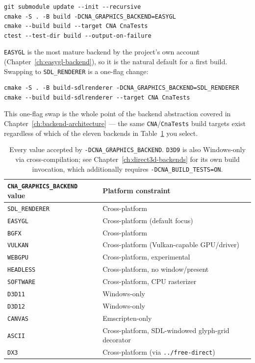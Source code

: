 \begin{lstlisting}[style=cnashell]
git submodule update --init --recursive
cmake -S . -B build -DCNA_GRAPHICS_BACKEND=EASYGL
cmake --build build --target CNA CnaTests
ctest --test-dir build --output-on-failure
\end{lstlisting}

\texttt{EASYGL} is the most mature backend by the project's own account (Chapter~\ref{ch:easygl-backend}),
so it is the natural default for a first build. Swapping to \texttt{SDL\_RENDERER} is a
one-flag change:

\begin{lstlisting}[style=cnashell]
cmake -S . -B build-sdlrenderer -DCNA_GRAPHICS_BACKEND=SDL_RENDERER
cmake --build build-sdlrenderer --target CNA CnaTests
\end{lstlisting}

This one-flag swap is the whole point of the backend abstraction covered in
Chapter~\ref{ch:backend-architecture} --- the same \texttt{CNA}/\texttt{CnaTests} build
targets exist regardless of which of the eleven backends in
Table~\ref{tab:backend-option-list} you select.

\begin{table}[h]
\centering
\begin{tabular}{ll}
\toprule
\textbf{\texttt{CNA\_GRAPHICS\_BACKEND} value} & \textbf{Platform constraint} \\
\midrule
\texttt{SDL\_RENDERER} & Cross-platform \\
\texttt{EASYGL}        & Cross-platform (default focus) \\
\texttt{BGFX}          & Cross-platform \\
\texttt{VULKAN}        & Cross-platform (Vulkan-capable GPU/driver) \\
\texttt{WEBGPU}        & Cross-platform, experimental \\
\texttt{HEADLESS}      & Cross-platform, no window/present \\
\texttt{SOFTWARE}      & Cross-platform, CPU rasterizer \\
\texttt{D3D11}         & Windows-only \\
\texttt{D3D12}         & Windows-only \\
\texttt{CANVAS}        & Emscripten-only \\
\texttt{ASCII}         & Cross-platform, SDL-windowed glyph-grid decorator \\
\texttt{DX3}           & Cross-platform (via \texttt{../free-direct}) \\
\bottomrule
\end{tabular}
\caption{Every value accepted by \texttt{-DCNA\_GRAPHICS\_BACKEND}. \texttt{D3D9} is also
Windows-only via cross-compilation; see Chapter~\ref{ch:direct3d-backends} for its own build
invocation, which additionally requires \texttt{-DCNA\_BUILD\_TESTS=ON}.}
\label{tab:backend-option-list}
\end{table}

